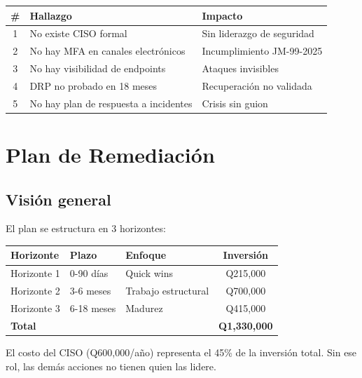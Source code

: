 \documentclass[11pt,a4paper]{article}
\begin{document}
	\begin{table}[H]
		\centering
		\begin{tabular}{@{}clp{7cm}@{}}
			\toprule
			\textbf{\#} & \textbf{Hallazgo} & \textbf{Impacto} \\ \midrule
			1 & No existe CISO formal & Sin liderazgo de seguridad \\
			2 & No hay MFA en canales electrónicos & Incumplimiento JM-99-2025 \\
			3 & No hay visibilidad de endpoints & Ataques invisibles \\
			4 & DRP no probado en 18 meses & Recuperación no validada \\
			5 & No hay plan de respuesta a incidentes & Crisis sin guion \\ \bottomrule
		\end{tabular}
	\end{table}
	
	
	\section{Plan de Remediación}
	
	\subsection{Visión general}
	
	El plan se estructura en 3 horizontes:
	
	\begin{table}[H]
		\centering
		\begin{tabular}{@{}lllc@{}}
			\toprule
			\textbf{Horizonte} & \textbf{Plazo} & \textbf{Enfoque} & \textbf{Inversión} \\ \midrule
			Horizonte 1 & 0-90 días & Quick wins & Q215,000 \\
			Horizonte 2 & 3-6 meses & Trabajo estructural & Q700,000 \\
			Horizonte 3 & 6-18 meses & Madurez & Q415,000 \\ \midrule
			\textbf{Total} & & & \textbf{Q1,330,000} \\ \bottomrule
		\end{tabular}
	\end{table}
	
	\begin{warnbox}
		El costo del CISO (Q600,000/año) representa el 45\% de la inversión total. Sin ese rol, las demás acciones no tienen quien las lidere.
	\end{warnbox}
	
\end{document}
